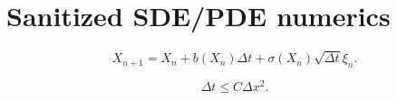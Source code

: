 \section{Sanitized SDE/PDE numerics}

\begin{equation}\label{eq:dept-euler-maruyama}
X_{n+1} = X_n + b(X_n)\Delta t + \sigma(X_n)\sqrt{\Delta t}\xi_n.
\end{equation}

\begin{equation}\label{eq:dept-pde-stability}
\Delta t \leq C \Delta x^2.
\end{equation}
